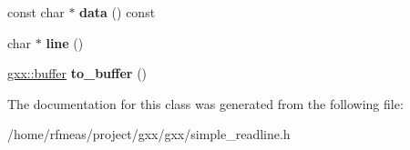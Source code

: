 \begin{DoxyCompactItemize}
\item 
const char $\ast$ {\bfseries data} () const \hypertarget{classgxx_1_1simple__readline_a8a2ff0d657d21c0ccba5a41427856a9d}{}\label{classgxx_1_1simple__readline_a8a2ff0d657d21c0ccba5a41427856a9d}

\item 
char $\ast$ {\bfseries line} ()\hypertarget{classgxx_1_1simple__readline_a186e88ca805b57a858d79df0844fecff}{}\label{classgxx_1_1simple__readline_a186e88ca805b57a858d79df0844fecff}

\item 
\hyperlink{classgxx_1_1buffer}{gxx\+::buffer} {\bfseries to\+\_\+buffer} ()\hypertarget{classgxx_1_1simple__readline_a83de13cd656701fa6b2902b9f03fb0bc}{}\label{classgxx_1_1simple__readline_a83de13cd656701fa6b2902b9f03fb0bc}

\end{DoxyCompactItemize}


The documentation for this class was generated from the following file\+:\begin{DoxyCompactItemize}
\item 
/home/rfmeas/project/gxx/gxx/simple\+\_\+readline.\+h\end{DoxyCompactItemize}
